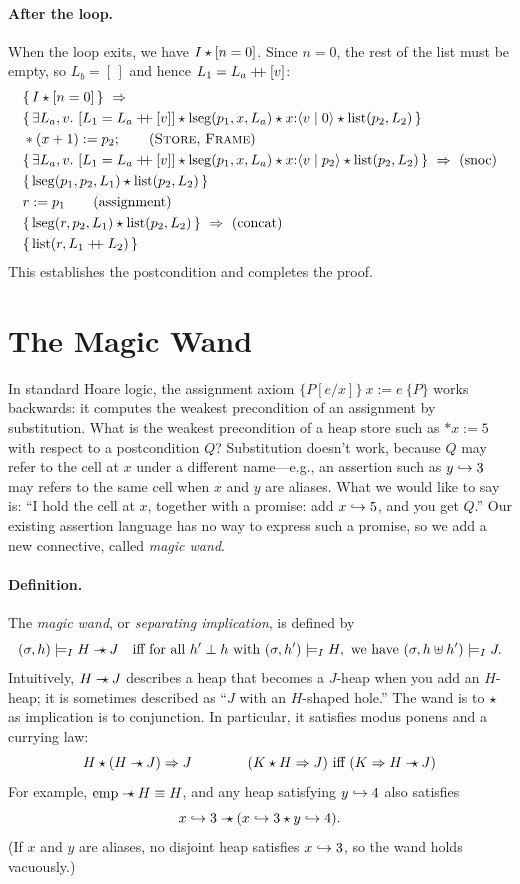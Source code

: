 \paragraph{After the loop.} When the loop exits, we have $I\mathbin{\star}[n=0]$. Since $n=0$, the rest
of the list must be empty, so $L_b=[\,]$ and hence $L_1=L_a\mathbin{+\!\!+}[v]$:
\begin{align*}
  &\{\,I\sep\pure{n=0}\,\}\ \Rightarrow\\
  &\{\,\exists L_a,v.\ \pure{L_1=L_a\app[v]}\sep\lseg(p_1,x,L_a)\sep\nd{x}{v}{0}\sep\lst(p_2,L_2)\,\}\\
  &\ast(x+1):=p_2;\qquad\text{(\rn{Store}, \rn{Frame})}\\
  &\{\,\exists L_a,v.\ \pure{L_1=L_a\app[v]}\sep\lseg(p_1,x,L_a)\sep\nd{x}{v}{p_2}\sep\lst(p_2,L_2)\,\}\ \Rightarrow\ \text{(snoc)}\\
  &\{\,\lseg(p_1,p_2,L_1)\sep\lst(p_2,L_2)\,\}\\
  &r:=p_1\qquad\text{(assignment)}\\
  &\{\,\lseg(r,p_2,L_1)\sep\lst(p_2,L_2)\,\}\ \Rightarrow\ \text{(concat)}\\
  &\{\,\lst(r,L_1\app L_2)\,\}
\end{align*}
This establishes the postcondition and completes the proof.

\section{The Magic Wand}

In standard Hoare logic, the assignment axiom $\{P[e/x]\}\ x:=e\ \{P\}$ works backwards: it
computes the weakest precondition of an assignment by substitution. What is the weakest
precondition of a heap store such as $\ast x:=5$ with respect to a postcondition $Q$? Substitution
doesn't work, because $Q$ may refer to the cell at $x$ under a different name---e.g., an assertion
such as $y\hookrightarrow 3$ may refers to the same cell when $x$ and $y$ are aliases. What we would like to
say is: ``I hold the cell at $x$, together with a promise: add $x\hookrightarrow 5$, and you get $Q$.'' Our
existing assertion language has no way to express such a promise, so we add a new connective,
called \emph{magic wand}.

\paragraph{Definition.} The \emph{magic wand}, or \emph{separating implication}, is defined by
\[
  (\sigma,h)\models_I H\mathbin{-\!\!\star} J\quad\text{iff for all } h'\perp h \text{ with } (\sigma,h')\models_I H,
  \text{ we have } (\sigma,h\uplus h')\models_I J.
\]
Intuitively, $H\mathbin{-\!\!\star} J$ describes a heap that becomes a $J$-heap when you add an $H$-heap; it is
sometimes described as ``$J$ with an $H$-shaped hole.'' The wand is to $\mathbin{\star}$ as implication is to
conjunction. In particular, it satisfies modus ponens and a currying law:
\[
  H\mathbin{\star}(H\mathbin{-\!\!\star} J)\Rightarrow J
  \qquad\qquad
  (K\mathbin{\star} H\Rightarrow J)\ \text{iff}\ (K\Rightarrow H\mathbin{-\!\!\star} J)
\]
For example, $\mathrm{emp}\mathbin{-\!\!\star} H\equiv H$, and any heap satisfying $y\hookrightarrow 4$ also satisfies
\[
  x\hookrightarrow 3\mathbin{-\!\!\star}(x\hookrightarrow 3\mathbin{\star} y\hookrightarrow 4).
\]
(If $x$ and $y$ are aliases, no disjoint heap satisfies $x\hookrightarrow 3$, so the wand holds vacuously.)

